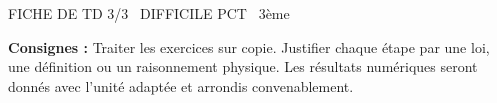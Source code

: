 \documentclass[11pt]{article}
\begin{document}
\begin{tcolorbox}[enhanced,colback=popink,colframe=popink,arc=10pt,boxrule=0pt,left=12pt,right=12pt,top=9pt,bottom=9pt]
{\color{white}\popxbold\small FICHE DE TD 3/3 \textbullet\ DIFFICILE \hfill PCT \textbullet\ 3ème\par}
\end{tcolorbox}
\vspace{4pt}
\noindent \textbf{Consignes :} Traiter les exercices sur copie. Justifier chaque étape par une loi, une définition ou un raisonnement physique. Les résultats numériques seront donnés avec l'unité adaptée et arrondis convenablement.
\end{document}
